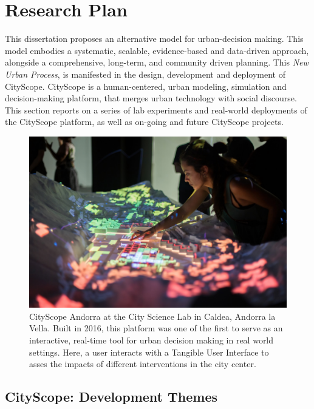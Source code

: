\section{Research Plan}

{This dissertation proposes an alternative model for urban-decision making. This model embodies a systematic, scalable, evidence-based and data-driven approach, alongside a comprehensive, long-term, and community driven planning. This \textit{New Urban Process}, is manifested in the design, development and deployment of CityScope. CityScope is a human-centered, urban modeling, simulation and decision-making platform, that merges urban technology with social discourse. This section reports on a series of lab experiments and real-world deployments of the CityScope platform, as well as on-going and future CityScope projects.}


\begin{figure}[t]
\begin{center}
    \includegraphics[width=\textwidth]{figures/csl_andorra.png}
\end{center}
   \caption{CityScope Andorra at the City Science Lab in Caldea, Andorra la Vella. Built in 2016, this platform was one of the first to serve as an interactive, real-time tool for urban decision making in real world settings. Here, a user interacts with a Tangible User Interface to asses the impacts of different interventions in the city center.}
\label{fig:csl_andorra}
\end{figure}


\subsection{CityScope: Development Themes}

